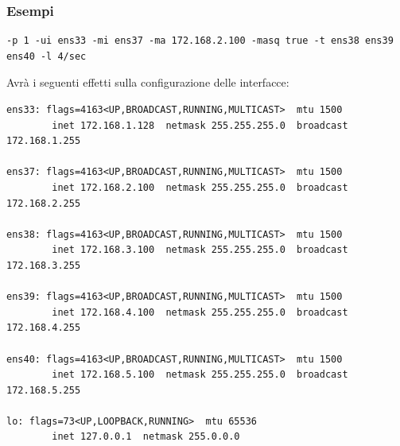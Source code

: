 \documentclass{beamer}
\begin{document}
\begin{frame}[fragile]
    \frametitle{Esempi}
    \begin{lstlisting}
-p 1 -ui ens33 -mi ens37 -ma 172.168.2.100 -masq true -t ens38 ens39 ens40 -l 4/sec
            \end{lstlisting}
    Avrà i seguenti effetti sulla configurazione delle interfacce:
    \begin{lstlisting}
ens33: flags=4163<UP,BROADCAST,RUNNING,MULTICAST>  mtu 1500
        inet 172.168.1.128  netmask 255.255.255.0  broadcast 172.168.1.255

ens37: flags=4163<UP,BROADCAST,RUNNING,MULTICAST>  mtu 1500
        inet 172.168.2.100  netmask 255.255.255.0  broadcast 172.168.2.255

ens38: flags=4163<UP,BROADCAST,RUNNING,MULTICAST>  mtu 1500
        inet 172.168.3.100  netmask 255.255.255.0  broadcast 172.168.3.255

ens39: flags=4163<UP,BROADCAST,RUNNING,MULTICAST>  mtu 1500
        inet 172.168.4.100  netmask 255.255.255.0  broadcast 172.168.4.255

ens40: flags=4163<UP,BROADCAST,RUNNING,MULTICAST>  mtu 1500
        inet 172.168.5.100  netmask 255.255.255.0  broadcast 172.168.5.255

lo: flags=73<UP,LOOPBACK,RUNNING>  mtu 65536
        inet 127.0.0.1  netmask 255.0.0.0
    \end{lstlisting}
\end{frame}
\end{document}
